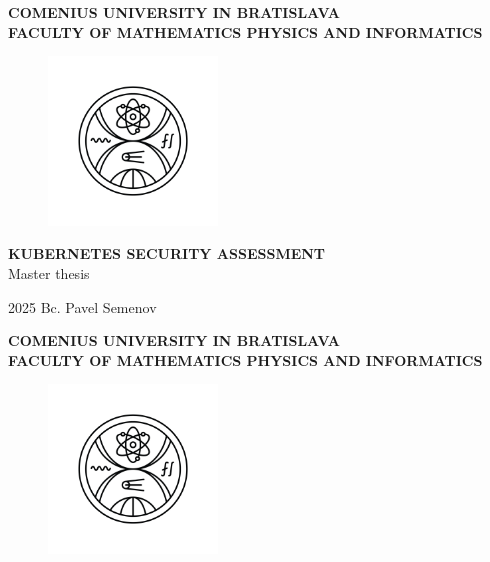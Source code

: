 \documentclass[12pt, oneside, openany]{book}
\def\mfrok{2025}
\def\mftitle{Kubernetes security assessment}
\def\mfthesistype{Master thesis}
\def\mfauthor{Bc. Pavel Semenov}
\def\mfuniversity{COMENIUS UNIVERSITY IN BRATISLAVA}
\def\mffaculty{FACULTY OF MATHEMATICS PHYSICS AND INFORMATICS}
\begin{document}
\frontmatter


\thispagestyle{empty}

\noindent
\begin{minipage}{\textwidth}
    \begin{center}
        \textbf{\mfuniversity \\
        \mffaculty}
    \end{center}
\end{minipage}

\vfill
\begin{figure}[!hbt]
	\begin{center}
		\includegraphics[width=0.4\textwidth]{images/FMFI_logo_BP.png}
		\label{img:logo}
	\end{center}
\end{figure}
\begin{center}
		\textbf{\MakeUppercase{\Large\mftitle}}\\
		\mfthesistype
\end{center}
\vfill
\mfrok \hfill
\mfauthor
\cleardoublepage



\thispagestyle{empty}
\noindent
\begin{minipage}{\textwidth}
    \begin{center}
        \textbf{\mfuniversity \\
        \mffaculty}
    \end{center}
\end{minipage}

\vfill
\begin{figure}[!hbt]
    \begin{center}
        \includegraphics[width=0.4\textwidth]{images/FMFI_logo_BP.png}
        \label{img:logo_dark}
    \end{center}
\end{figure}
\end{document}
